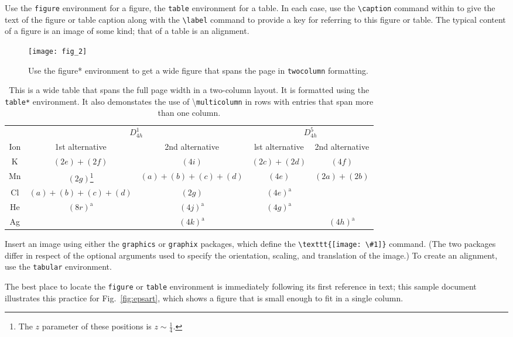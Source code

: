 \documentclass[%
 reprint,
 amsmath,amssymb,
 aps,
]{revtex4-2}
\begin{document}
Use the \texttt{figure} environment for a figure, the \texttt{table} environment for a table.
In each case, use the \verb+\caption+ command within to give the text of the
figure or table caption along with the \verb+\label+ command to provide
a key for referring to this figure or table.
The typical content of a figure is an image of some kind; 
that of a table is an alignment.%
\begin{figure}
\texttt{[image: fig\_2]}%
\caption{\label{fig:wide}Use the figure* environment to get a wide
figure that spans the page in \texttt{twocolumn} formatting.}
\end{figure}
\begin{table}
\caption{\label{tab:table3}This is a wide table that spans the full page
width in a two-column layout. It is formatted using the
\texttt{table*} environment. It also demonstates the use of
\textbackslash\texttt{multicolumn} in rows with entries that span
more than one column.}
\begin{ruledtabular}
\begin{tabular}{ccccc}
 &\multicolumn{2}{c}{$D_{4h}^1$}&\multicolumn{2}{c}{$D_{4h}^5$}\\
 Ion&1st alternative&2nd alternative&lst alternative
&2nd alternative\\ \hline
 K&$(2e)+(2f)$&$(4i)$ &$(2c)+(2d)$&$(4f)$ \\
 Mn&$(2g)$\footnote{The $z$ parameter of these positions is $z\sim\frac{1}{4}$.}
 &$(a)+(b)+(c)+(d)$&$(4e)$&$(2a)+(2b)$\\
 Cl&$(a)+(b)+(c)+(d)$&$(2g)$\footnotemark[1]
 &$(4e)^{\text{a}}$\\
 He&$(8r)^{\text{a}}$&$(4j)^{\text{a}}$&$(4g)^{\text{a}}$\\
 Ag& &$(4k)^{\text{a}}$& &$(4h)^{\text{a}}$\\
\end{tabular}
\end{ruledtabular}
\end{table}

Insert an image using either the \texttt{graphics} or
\texttt{graphix} packages, which define the \verb+\texttt{[image: \#1]}+ command.
(The two packages differ in respect of the optional arguments 
used to specify the orientation, scaling, and translation of the image.) 
To create an alignment, use the \texttt{tabular} environment. 

The best place to locate the \texttt{figure} or \texttt{table} environment
is immediately following its first reference in text; this sample document
illustrates this practice for Fig.~\ref{fig:epsart}, which
shows a figure that is small enough to fit in a single column. 
\end{document}

